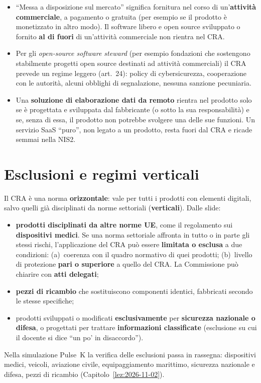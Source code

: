 \begin{integrazione}
\begin{itemize}
  \item ``Messa a disposizione sul mercato'' significa fornitura nel corso di un'\textbf{attività
    commerciale}, a pagamento o gratuita (per esempio se il prodotto è monetizzato in altro modo). Il
    software libero e open source sviluppato o fornito \textbf{al di fuori} di un'attività commerciale
    non rientra nel CRA.
  \item Per gli \emph{open-source software steward} (per esempio fondazioni che sostengono stabilmente
    progetti open source destinati ad attività commerciali) il CRA prevede un regime leggero (art.~24):
    policy di cybersicurezza, cooperazione con le autorità, alcuni obblighi di segnalazione, nessuna
    sanzione pecuniaria.
  \item Una \textbf{soluzione di elaborazione dati da remoto} rientra nel prodotto solo se è progettata e
    sviluppata dal fabbricante (o sotto la sua responsabilità) e se, senza di essa, il prodotto non
    potrebbe svolgere una delle sue funzioni. Un servizio SaaS ``puro'', non legato a un prodotto,
    resta fuori dal CRA e ricade semmai nella NIS2.
\end{itemize}
\end{integrazione}

\section{Esclusioni e regimi verticali}
\label{sec:cra-esclusioni}

Il CRA è una norma \textbf{orizzontale}: vale per tutti i prodotti con elementi digitali, salvo quelli
già disciplinati da norme settoriali (\textbf{verticali}). Dalle slide:
\begin{itemize}
  \item \textbf{prodotti disciplinati da altre norme UE}, come il regolamento sui \textbf{dispositivi
    medici}. Se una norma settoriale affronta in tutto o in parte gli stessi rischi, l'applicazione del CRA
    può essere \textbf{limitata o esclusa} a due condizioni: (a)~coerenza con il quadro normativo di quei
    prodotti; (b)~livello di protezione \textbf{pari o superiore} a quello del CRA. La Commissione può
    chiarire con \textbf{atti delegati};
  \item \textbf{pezzi di ricambio} che sostituiscono componenti identici, fabbricati secondo le stesse
    specifiche;
  \item prodotti sviluppati o modificati \textbf{esclusivamente} per \textbf{sicurezza nazionale o
    difesa}, o progettati per trattare \textbf{informazioni classificate} (esclusione su cui il docente si
    dice ``un po' in disaccordo'').
\end{itemize}
Nella simulazione Pulse~K la verifica delle esclusioni passa in rassegna: dispositivi medici, veicoli,
aviazione civile, equipaggiamento marittimo, sicurezza nazionale e difesa, pezzi di ricambio
(Capitolo~\ref{lez:2026-11-02}).

